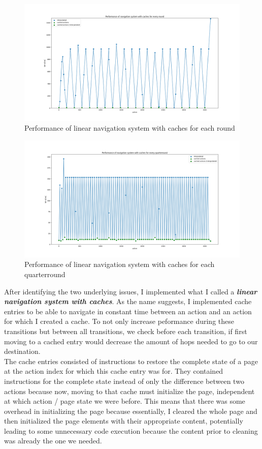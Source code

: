 \begin{figure}
\centering
\includegraphics[width=\textwidth]{figures/pyplot/performance_navsystem-round-cache.png}
\caption{Performance of linear navigation system with caches for each round}
\label{fig:navsystem.performance.round}
\end{figure}

\begin{figure}
\centering
\includegraphics[width=\textwidth]{figures/pyplot/performance_navsystem-qr-cache.png}
\caption{Performance of linear navigation system with caches for each quarterround}
\label{fig:navsystem.performance.qr}
\end{figure}

After identifying the two underlying issues, I implemented what I called a \textbf{\textit{linear navigation system with caches}}. As the name suggests, I implemented cache entries to be able to navigate in constant time between an action and an action for which I created a cache. To not only increase peformance during these transitions but between all transitions, we check before each transition, if first moving to a cached entry would decrease the amount of hops needed to go to our destination. \\
The cache entries consisted of instructions to restore the complete state of a page at the action index for which this cache entry was for. They contained instructions for the complete state instead of only the difference between two actions because now, moving to that cache must initialize the page, independent at which action / page state we were before. This means that there was some overhead in initializing the page because essentially, I cleared the whole page and then initialized the page elements with their appropriate content, potentially leading to some unnecessary code execution because the content prior to cleaning was already the one we needed. 


